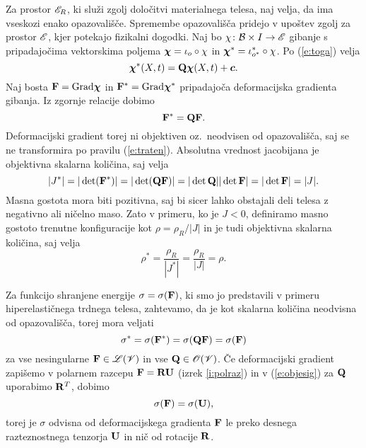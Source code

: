 Za prostor $\mathscr E_R$, ki služi zgolj določitvi materialnega telesa, naj velja,
da ima vseskozi enako opazovališče. Spremembe opazovališča pridejo v upoštev zgolj
za prostor $\mathscr E$, kjer potekajo fizikalni dogodki. Naj bo $\chi\colon\mathcal B\times I\to\mathscr E$
gibanje s pripadajočima vektorskima poljema $\boldsymbol \chi=\iota_o\circ\chi$ in
$\boldsymbol \chi^*=\iota^*_{o^*}\circ\chi$. Po (\ref{e:toga}) velja
\[
	\boldsymbol \chi^*(X,t)=\mathbf Q\boldsymbol \chi(X,t)+\boldsymbol c.
\]
Naj bosta $\mathbf F=\mathrm{Grad}\boldsymbol \chi$ in $\mathbf F^*=\mathrm{Grad}\boldsymbol \chi^*$ pripadajoča
deformacijska gradienta gibanja. Iz zgornje relacije dobimo
\[
	\mathbf F^*=\mathbf Q\mathbf F.
\]
Deformacijski gradient torej ni objektiven oz.~neodvisen od opazovališča, saj se ne
transformira po pravilu (\ref{e:traten}). Absolutna vrednost jacobijana je objektivna skalarna
količina, saj velja
\[
	|J^*|=|\det(\mathbf F^*)|=|\det(\mathbf Q\mathbf F)|=|\det\mathbf Q||\det\mathbf F|
	=|\det\mathbf F|=|J|.
\]
Masna gostota mora biti pozitivna, saj bi sicer lahko obstajali deli telesa
z negativno ali ničelno maso. Zato v primeru, ko je $J<0$, definiramo masno
gostoto trenutne konfiguracije kot $\rho=\rho_R/|J|$ in je tudi objektivna skalarna količina,
saj velja
\[ \rho^*=\frac{\rho_R}{|J^*|}=\frac{\rho_R}{|J|}=\rho. \]

Za funkcijo shranjene energije $\sigma=\sigma(\mathbf F)$, ki smo jo predstavili v primeru
hiperelastičnega trdnega telesa, zahtevamo, da je kot skalarna količina neodvisna
od opazovališča, torej mora veljati
\begin{equation} \label{e:objesig}
	\sigma^*=\sigma(\mathbf F^*)=\sigma(\mathbf Q\mathbf F)=\sigma(\mathbf F)
\end{equation}
za vse nesingularne $\mathbf F\in\mathscr L(\mathscr V)$ in vse $\mathbf Q\in\mathscr{O}(\mathscr V)$.
Če deformacijski gradient zapišemo v polarnem razcepu $\mathbf F=\mathbf R\mathbf U$ (izrek \ref{i:polraz})
in v (\ref{e:objesig}) za $\mathbf Q$ uporabimo $\mathbf R^T$, dobimo
\begin{equation} \label{e:siuonly}
	\sigma(\mathbf F)=\sigma(\mathbf U),
\end{equation}
torej je $\sigma$ odvisna od deformacijskega gradienta $\mathbf F$ le preko desnega
razteznostnega tenzorja $\mathbf U$ in nič od rotacije $\mathbf R$.

